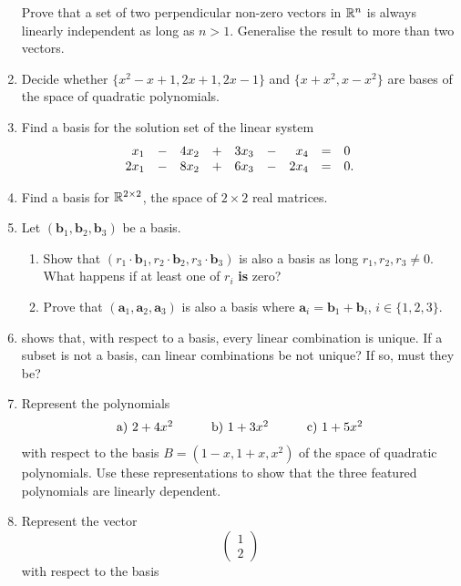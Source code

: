 \begin{enumerate}
 Prove that a set of two perpendicular non-zero vectors in $\mathbb{R}^{n}$ is always
 linearly independent as long as $n > 1$. Generalise the result to more than two
 vectors.
\item 
 Decide whether $\{x^2 - x + 1, 2x + 1,2x - 1\}$ and $\{x + x^2,x - x^2\}$ are bases
 of the space of quadratic polynomials.
\item 
 Find a basis for the solution set of the linear system
 \[
  \begin{array}{r c r c r c r c l}
   x_1 & - & 4x_2 & + & 3x_3 & - & x_4 & = & 0\\
   2x_1 & - & 8x_2 & + & 6x_3 & - & 2x_4 & = & 0.
  \end{array}
 \]
\item 
 Find a basis for $\mathbb{R}^{2 \times 2}$, the space of $2 \times 2$ real matrices.
\item 
 Let $(\mathbf{b}_1,\mathbf{b}_2,\mathbf{b}_3)$ be a basis.
 \begin{enumerate}[label=(\alph*)]
  \item Show that $(r_1 \cdot \mathbf{b}_1, r_2 \cdot \mathbf{b}_2, r_3 \cdot
   \mathbf{b}_3)$ is also a basis as long $r_1,r_2,r_3 \neq 0$. What happens if
   at least one of $r_i$ \textbf{is} zero?
  \item Prove that $(\mathbf{a}_1,\mathbf{a}_2,\mathbf{a}_3)$ is also a basis
   where $\mathbf{a}_i = \mathbf{b}_1 + \mathbf{b}_i$, $i \in \{1,2,3\}$.
 \end{enumerate}
\item 
  shows that, with respect to a
 basis, every linear combination is unique. If a subset is not a basis, can
 linear combinations be not unique? If so, must they be?
\item 
 Represent the polynomials
 \[
  \begin{array}{r r r}
   \text{a) } 2 + 4x^2 \hspace{2em}& \text{b) } 1 + 3x^2 \hspace{2em}& \text{c)
   } 1 + 5x^2
  \end{array}
 \]
 with respect to the basis $B = (1 - x, 1 + x, x^2)$ of the space of quadratic
 polynomials. Use these representations to show that the three featured
 polynomials are linearly dependent.
\item 
 Represent the vector
 \[
  \begin{pmatrix}
   1\\
   2
  \end{pmatrix}
 \]
 with respect to the basis

\end{enumerate}

